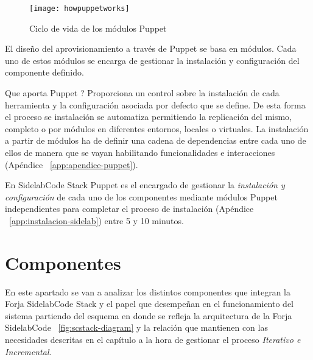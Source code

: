 \begin{figure}[H]
    \centering
    \texttt{[image: howpuppetworks]}
    \caption{Ciclo de vida de los módulos Puppet}
    \label{fig:howpuppetworks}
\end{figure}

\par El diseño del aprovisionamiento a través de Puppet se basa en módulos. Cada uno de estos módulos se encarga de gestionar la instalación y configuración del componente definido.

\par Que aporta Puppet ? Proporciona un control sobre la instalación de cada herramienta y la configuración asociada por defecto que se define. De esta forma el proceso se instalación se automatiza permitiendo la replicación del mismo, completo o por módulos en diferentes entornos, locales o virtuales. La instalación a partir de módulos ha de definir una cadena de dependencias entre cada uno de ellos de manera que se vayan habilitando funcionalidades e interacciones (Apéndice ~\ref{app:apendice-puppet}).

\par En SidelabCode Stack Puppet es el encargado de gestionar la \emph{instalación y configuración} de cada uno de los componentes mediante módulos Puppet independientes para completar el proceso de instalación (Apéndice ~\ref{app:instalacion-sidelab}) entre 5 y 10 minutos.


\section{Componentes}
\label{sec:componentes}

\par En este apartado se van a analizar los distintos componentes que integran la Forja SidelabCode Stack y el papel que desempeñan en el funcionamiento del sistema partiendo del esquema en donde se refleja la arquitectura de la Forja SidelabCode ~\ref{fig:scstack-diagram} y la relación que mantienen con las necesidades descritas en el capítulo  a la hora de gestionar el proceso \emph{Iterativo e Incremental}.


